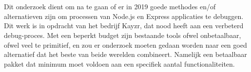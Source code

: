 
%
%

%



\chapter*{}

Dit onderzoek dient om na te gaan of er in 2019 goede methodes en/of alternatieven zijn om processen van Node.js en Express applicaties te debuggen. Dit werk is in opdracht van het bedrijf Kayzr, dat nood heeft aan een verbeterd debug-proces. Met een beperkt budget zijn bestaande tools ofwel onbetaalbaar, ofwel veel te primitief, en zou er onderzoek moeten gedaan worden naar een goed alternatief dat het beste van beide werelden combineert. Namelijk een betaalbaar pakket dat minimum moet voldoen aan een specifiek aantal functionaliteiten.

